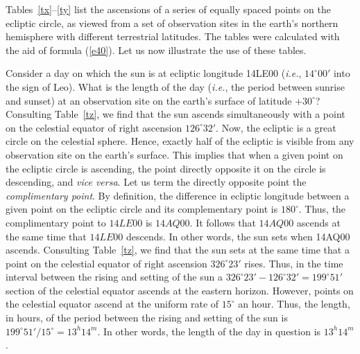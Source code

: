 Tables~\ref{tx}--\ref{ty} list the ascensions of a series of equally spaced points on the ecliptic
circle, as viewed from a set of observation sites in the earth's northern
hemisphere with different terrestrial latitudes. The tables were calculated with the aid of
formula (\ref{e40}). Let us now illustrate the use of these tables.

Consider a day on which the sun is at ecliptic longitude 14LE00 ({\em i.e.},
$14^\circ 00'$ into the sign of Leo). What is the length of the day ({\em i.e.}, the period between sunrise and sunset) at
an observation site on the earth's surface of latitude $+30^\circ$? Consulting
Table~\ref{tz}, we find that the sun ascends simultaneously with a
point on the celestial equator of right ascension $126^\circ 32'$. Now,
the ecliptic is a great circle on the celestial sphere. Hence, exactly half of the ecliptic
is  visible from any observation site on the earth's surface. This implies that
when a given point on the ecliptic circle is ascending, the point directly
opposite it on the circle is descending, and {\em vice versa}. Let us
term the directly opposite point the {\em complimentary point}. 
By definition, the difference in ecliptic longitude between a given point on the
ecliptic circle and its complementary point is $180^\circ$. Thus, the
complimentary point to $14LE00$ is $14AQ00$. It follows that
 $14AQ00$ ascends at the same time that $14LE00$ descends.
 In other words, the sun sets when 14AQ00 ascends.
 Consulting Table~\ref{tz}, we find that the sun sets at the
 same time that a point on the celestial equator of right ascension 
 $326^\circ 23'$ rises. Thus, in the time interval between the rising and
 setting  of the sun a $326^\circ23'-126^\circ 32' = 199^\circ 51'$ section
 of the celestial equator ascends at the eastern horizon. However, points on the celestial
 equator ascend at the uniform rate of $15^\circ$ an hour. Thus,
 the length, in hours,  of the period between the rising and setting of the sun  is $199^\circ 51'/15^\circ = 13^h 14^m.$ In other words, the
 length of the day in question is $13^h 14^m$.
 
